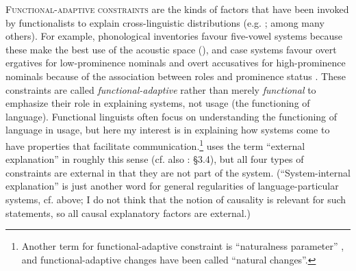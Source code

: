 \documentclass[output=paper]{langsci/langscibook}
\begin{document}
\textsc{Functional-adaptive constraints} are the kinds of factors that have been invoked by functionalists to explain cross-linguistic distributions (e.g. \citealt{Tomlin1986,Malchukov2008,Hawkins2014_VarEff}; among many others). For example, phonological inventories favour five-vowel systems because these make the best use of the acoustic space (\citealt{DeBoer2001}), and case systems favour overt ergatives for low-prominence nominals and overt accusatives for high-prominence nominals because of the association between roles and prominence status \citep{Dixon1994}. These constraints are called \textit{functional-adaptive} rather than merely \textit{functional} to emphasize their role in explaining systems, not usage (the functioning of language). Functional linguists often focus on understanding the functioning of language in usage, but here my interest is in explaining how systems come to have properties that facilitate communication.\footnote{Another term for functional-adaptive constraint is “naturalness parameter” \citep{DresslerEtAl1987}, and functional-adaptive changes have been called “natural changes”.} \citet{Good2008_Intro} uses the term “external explanation” in roughly this sense (cf. also \citealt{Newmeyer1998}: §3.4), but all four types of constraints are external in that they are not part of the system. (“System-internal explanation” is just another word for general regularities of language-particular systems, cf.  above; I do not think that the notion of causality is relevant for such statements, so all causal explanatory factors are external.)
\end{document}

